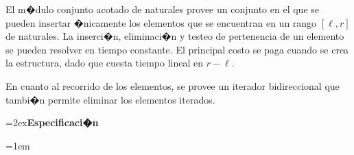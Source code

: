 \documentclass[a4paper,10pt]{article}
\begin{document}
El m�dulo conjunto acotado de naturales provee un conjunto en el que se pueden insertar �nicamente los elementos que se encuentran en un rango $[\ell, r]$ de naturales.  La inserci�n, eliminaci�n y testeo de pertenencia de un elemento se pueden resolver en tiempo constante.  El principal costo se paga cuando se crea la estructura, dado que cuesta tiempo lineal en $r - \ell$.

En cuanto al recorrido de los elementos, se provee un iterador bidireccional que tambi�n permite eliminar los elementos iterados.

{\parskip=2ex\noindent\Large \textbf{Especificaci�n}\par}

\begin{tad}{}
  \parskip=0pt

  {
  \tadAnchoEncabezados=1em
  }

  \tadObservadores

  \tadGeneradores

  \tadOtrasOperaciones
  \tadNoAlinearFunciones

  \tadAxiomas
\end{tad}
\end{document}
